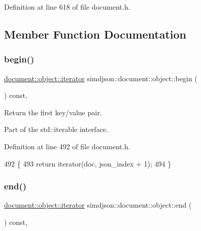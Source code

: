 Definition at line 618 of file document.\+h.



\subsection{Member Function Documentation}
\mbox{\label{classsimdjson_1_1document_1_1object_a88e638207141099532b524a8814540e0}} 
\subsubsection{\texorpdfstring{begin()}{begin()}}
{\footnotesize\ttfamily \hyperlink{classsimdjson_1_1document_1_1object_1_1iterator}{document\+::object\+::iterator} simdjson\+::document\+::object\+::begin (\begin{DoxyParamCaption}{ }\end{DoxyParamCaption}) const\hspace{0.3cm}{\ttfamily [inline]}, {\ttfamily [noexcept]}}



Return the first key/value pair. 

Part of the std\+::iterable interface. 

Definition at line 492 of file document.\+h.


\begin{DoxyCode}
492                                                                    \{
493   \textcolor{keywordflow}{return} iterator(doc, json\_index + 1);
494 \}
\end{DoxyCode}
\mbox{\label{classsimdjson_1_1document_1_1object_a38ab9979d9eecb0b70768dcde9d12864}} 
\subsubsection{\texorpdfstring{end()}{end()}}
{\footnotesize\ttfamily \hyperlink{classsimdjson_1_1document_1_1object_1_1iterator}{document\+::object\+::iterator} simdjson\+::document\+::object\+::end (\begin{DoxyParamCaption}{ }\end{DoxyParamCaption}) const\hspace{0.3cm}{\ttfamily [inline]}, {\ttfamily [noexcept]}}



